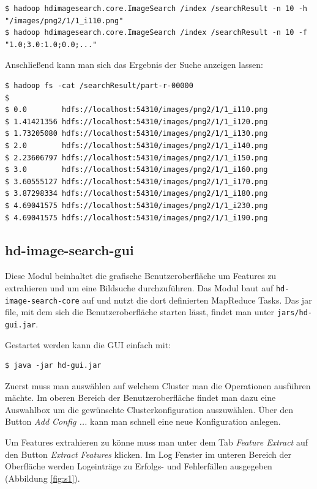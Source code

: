 \documentclass[paper=a4, fontsize=11pt]{scrartcl} %
\numberwithin{equation}{section} %
\numberwithin{figure}{section} %
\numberwithin{table}{section} %
\begin{document}
\begin{lstlisting}
$ hadoop hdimagesearch.core.ImageSearch /index /searchResult -n 10 -h "/images/png2/1/1_i110.png"
$ hadoop hdimagesearch.core.ImageSearch /index /searchResult -n 10 -f "1.0;3.0:1.0;0.0;..."
\end{lstlisting}

Anschließend kann man sich das Ergebnis der Suche anzeigen lassen:
\begin{lstlisting}
$ hadoop fs -cat /searchResult/part-r-00000
$ 
$ 0.0        hdfs://localhost:54310/images/png2/1/1_i110.png
$ 1.41421356 hdfs://localhost:54310/images/png2/1/1_i120.png
$ 1.73205080 hdfs://localhost:54310/images/png2/1/1_i130.png
$ 2.0        hdfs://localhost:54310/images/png2/1/1_i140.png
$ 2.23606797 hdfs://localhost:54310/images/png2/1/1_i150.png
$ 3.0        hdfs://localhost:54310/images/png2/1/1_i160.png
$ 3.60555127 hdfs://localhost:54310/images/png2/1/1_i170.png
$ 3.87298334 hdfs://localhost:54310/images/png2/1/1_i180.png
$ 4.69041575 hdfs://localhost:54310/images/png2/1/1_i230.png
$ 4.69041575 hdfs://localhost:54310/images/png2/1/1_i190.png
\end{lstlisting}

\subsection{hd-image-search-gui}
Diese Modul beinhaltet die grafische Benutzeroberfläche um Features zu extrahieren und um eine Bildsuche durchzuführen. Das Modul baut auf \lstinline$hd-image-search-core$ auf und nutzt die dort definierten MapReduce Tasks. Das jar file, mit dem sich die Benutzeroberfläche starten lässt, findet man unter \lstinline$jars/hd-gui.jar$.

Gestartet werden kann die GUI einfach mit:
\begin{lstlisting}
$ java -jar hd-gui.jar 
\end{lstlisting}

Zuerst muss man auswählen auf welchem Cluster man die Operationen ausführen mächte. Im oberen Bereich der Benutzeroberfläche findet man dazu eine Auswahlbox um die gewünschte Clusterkonfiguration auszuwählen. Über den Button \emph{Add Config ...} kann man schnell eine neue Konfiguration anlegen.

Um Features extrahieren zu könne muss man unter dem Tab \emph{Feature Extract} auf den Button \emph{Extract Features} klicken. Im Log Fenster im unteren Bereich der Oberfläche werden Logeinträge zu Erfolgs- und Fehlerfällen ausgegeben (Abbildung \ref{fig:s1}).
\end{document}
